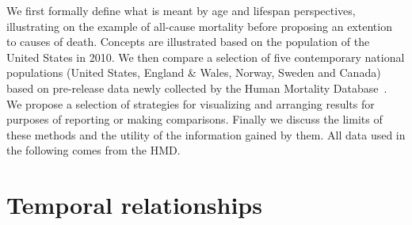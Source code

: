 \documentclass{article}
\begin{document}
We first formally define what is meant by age and lifespan
perspectives, illustrating on the example of all-cause
mortality before proposing an extention to causes of death. Concepts are
illustrated based on the population of the United States in 2010. We then
compare a selection of five contemporary national populations (United States, England \& Wales, Norway, Sweden and Canada) based on pre-release
data newly collected by the Human Mortality
Database~. We propose
a selection of strategies for visualizing and arranging results for purposes of
reporting or making comparisons. Finally we discuss the limits of these methods and the utility of the information gained by them. All data used in the following comes from the HMD.

\section*{Temporal relationships}

\end{document}
